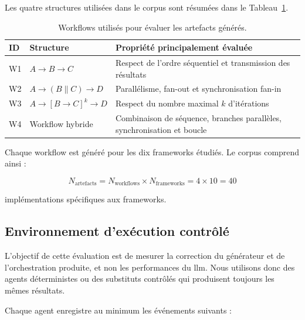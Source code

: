 Les quatre structures utilisées dans le corpus sont résumées dans le
Tableau~\ref{tab:workflows-evaluation}.

\begin{table}[t]
    \centering
    \caption{Workflows utilisés pour évaluer les artefacts générés.}
    \label{tab:workflows-evaluation}
    \begin{tabularx}{\textwidth}{@{}l l >{\raggedright\arraybackslash}X@{}}
        \toprule
        \textbf{ID}
        & \textbf{Structure}
        & \textbf{Propriété principalement évaluée} \\
        \midrule
        W1
            & $A \rightarrow B \rightarrow C$
            & Respect de l'ordre séquentiel et transmission des
              résultats \\
        W2
            & $A \rightarrow (B \parallel C) \rightarrow D$
            & Parallélisme, fan-out et synchronisation fan-in \\
        W3
            & $A \rightarrow [B \rightarrow C]^{k} \rightarrow D$
            & Respect du nombre maximal $k$ d'itérations \\
        W4
            & Workflow hybride
            & Combinaison de séquence, branches parallèles,
              synchronisation et boucle \\
        \bottomrule
    \end{tabularx}
\end{table}

Chaque workflow est généré pour les dix frameworks étudiés. Le corpus
comprend ainsi :

\begin{equation}
N_{\mathrm{artefacts}}
=
N_{\mathrm{workflows}}
\times
N_{\mathrm{frameworks}}
=
4 \times 10
=
40
\end{equation}

implémentations spécifiques aux frameworks.


\subsection{Environnement d'exécution contrôlé}
\label{subsec:environnement-controle}

L'objectif de cette évaluation est de mesurer la correction du
générateur et de l'orchestration produite, et non les performances du
\gls{llm}. Nous utilisons donc des agents déterministes ou des
substituts contrôlés qui produisent toujours les mêmes résultats.

Chaque agent enregistre au minimum les événements suivants :

